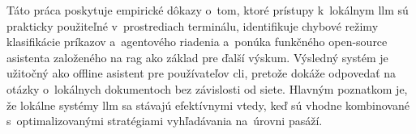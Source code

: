 Táto práca poskytuje empirické dôkazy o~tom, ktoré prístupy k~lokálnym \gls{llm} sú prakticky použiteľné v~prostrediach terminálu, identifikuje chybové režimy klasifikácie príkazov a~agentového riadenia a~ponúka funkčného open-source asistenta založeného na \gls{rag} ako základ pre ďalší výskum. Výsledný systém je užitočný ako offline asistent pre používateľov \gls{cli}, pretože dokáže odpovedať na otázky o~lokálnych dokumentoch bez závislosti od siete. Hlavným poznatkom je, že lokálne systémy \gls{llm} sa stávajú efektívnymi vtedy, keď sú vhodne kombinované s~optimalizovanými stratégiami vyhľadávania na~úrovni pasáží.

%
%
%
%
%
%
%
%
